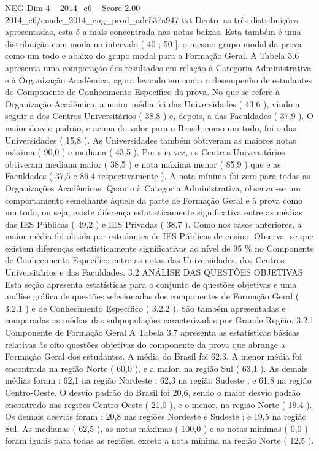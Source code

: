 \begin{textsample}{NEG Dim 4 – 2014\_c6 – Score 2.00 – 2014\_c6/enade\_2014\_eng\_prod\_adc537a947.txt}
Dentre as três distribuições apresentadas, esta é a mais concentrada nas notas baixas.
Esta também é uma distribuição com moda no intervalo ( 40 ; 50 ], o mesmo grupo modal da prova como um todo e abaixo do grupo modal para a Formação Geral.
A Tabela 3.6 apresenta uma comparação dos resultados em relação à Categoria Administrativa e à Organização Acadêmica, agora levando em conta o desempenho de estudantes do Componente de Conhecimento Específico da prova.
No que se refere à Organização Acadêmica, a maior média foi das Universidades ( 43,6 ), vindo a seguir a dos Centros Universitários ( 38,8 ) e, depois, a das Faculdades ( 37,9 ).
O maior desvio padrão, e acima do valor para o Brasil, como um todo, foi o das Universidades ( 15,8 ).
As Universidades também obtiveram as maiores notas máxima ( 90,0 ) e mediana ( 43,5 ).
Por sua vez, os Centros Universitários obtiveram mediana maior ( 38,5 ) e nota máxima menor ( 85,9 ) que e as Faculdades ( 37,5 e 86,4 respectivamente ).
A nota mínima foi zero para todas as Organizações Acadêmicas.
Quanto à Categoria Administrativa, observa -se um comportamento semelhante àquele da parte de Formação Geral e à prova como um todo, ou seja, existe diferença estatisticamente significativa entre as médias das IES Públicas ( 49,2 ) e IES Privadas ( 38,7 ).
Como nos casos anteriores, a maior média foi obtida por estudantes de IES Públicas de ensino.
Observa -se que existem diferenças estatisticamente significativas ao nível de 95 \% no Componente de Conhecimento Específico entre as notas das Universidades, dos Centros Universitários e das Faculdades. 3.2 ANÁLISE DAS QUESTÕES OBJETIVAS Esta seção apresenta estatísticas para o conjunto de questões objetivas e uma análise gráfica de questões selecionadas dos componentes de Formação Geral ( 3.2.1 ) e de Conhecimento Específico ( 3.2.2 ).
São também apresentadas e comparadas as médias das subpopulações caracterizadas por Grande Região. 3.2.1 Componente de Formação Geral A Tabela 3.7 apresenta as estatísticas básicas relativas às oito questões objetivas do componente da prova que abrange a Formação Geral dos estudantes.
A média do Brasil foi 62,3.
A menor média foi encontrada na região Norte ( 60,0 ), e a maior, na região Sul ( 63,1 ).
As demais médias foram : 62,1 na região Nordeste ; 62,3 na região Sudeste ; e 61,8 na região Centro-Oeste.
O desvio padrão do Brasil foi 20,6, sendo o maior desvio padrão encontrado nas regiões Centro-Oeste ( 21,0 ), e o menor, na região Norte ( 19,4 ).
Os demais desvios foram : 20,8 nas regiões Nordeste e Sudeste ; e 19,5 na região Sul.
As medianas ( 62,5 ), as notas máximas ( 100,0 ) e as notas mínimas ( 0,0 ) foram iguais para todas as regiões, exceto a nota mínima na região Norte ( 12,5 ).

\end{textsample}
